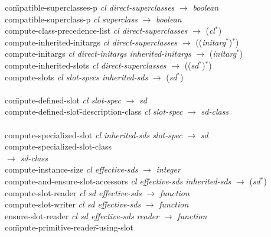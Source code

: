 \begin{optDefinition}
\begin{figure*}[t]
\begin{center}\begin{minipage}[t]{\textwidth}
{\small\tt\begin{tabbing}
co\=mpatible-superclasses-p {\em cl direct-superclasses\/} $\rightarrow$ {\em boolean}\\
  \>compatible-superclass-p {\em cl superclass\/} $\rightarrow$ {\em boolean}\\
compute-class-precedence-list {\em cl direct-superclasses\/} $\rightarrow$ ({\em cl\/}$^*$)\\
compute-inherited-initargs {\em cl direct-superclasses\/} $\rightarrow$ (({\em initarg\/}$^*$)$^*$)\\
compute-initargs {\em cl direct-initargs inherited-initargs\/} $\rightarrow$ ({\em initarg\/}$^*$)\\
compute-inherited-slots {\em cl direct-superclasses\/} $\rightarrow$ (({\em sd\/}$^*$)$^*$)\\
compute-slots {\em cl slot-specs inherited-sds\/} $\rightarrow$ ({\em sd\/}$^*$)\\
  \\
  \>co\=mpute-defined-slot {\em cl slot-spec\/} $\rightarrow$ {\em sd}\\
  \>  \>compute-defined-slot\=-description-class {\em cl slot-spec\/} $\rightarrow$ {\em sd-class}\\
  \\
  \>compute-specialized-slot {\em cl inherited-sds slot-spec\/} $\rightarrow$ {\em sd}\\
  \>  \>compute-specialized-slot-class\\
  \>  \>                     $\rightarrow$ {\em sd-class}\\
compute-instance-size {\em cl effective-sds\/} $\rightarrow$ {\em integer}\\
compute-and-ensure-slot-accessors {\em cl effective-sds inherited-sds\/} $\rightarrow$ ({\em sd\/}$^*$)\\
  \>compute-slot-reader {\em cl sd effective-sds\/} $\rightarrow$ {\em function}\\
  \>compute-slot-writer {\em cl sd effective-sds\/} $\rightarrow$ {\em function}\\
  \>ensure-slot-reader {\em cl sd effective-sds reader\/} $\rightarrow$ {\em function}\\
  \>  \>co\=mpute-primitive-reader\=-using-slot\\

\end{tabbing}}
\end{minipage}
\end{center}
\end{figure*}
\end{optDefinition}
